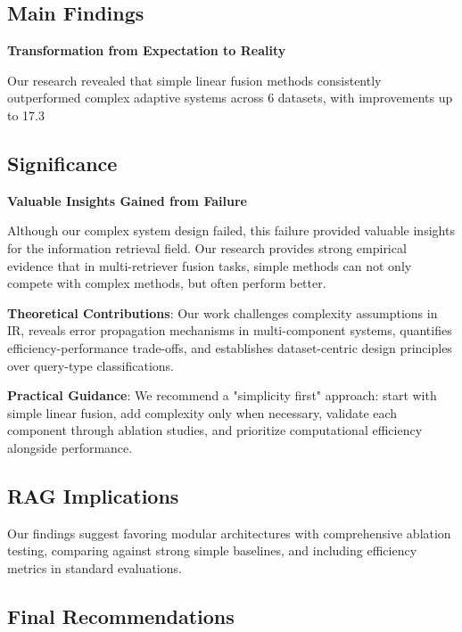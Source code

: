 \documentclass[letterpaper]{article} %
\begin{document}
\subsection{Main Findings}

\textbf{Transformation from Expectation to Reality}

Our research revealed that simple linear fusion methods consistently outperformed complex adaptive systems across 6 datasets, with improvements up to 17.3%

\subsection{Significance}

\textbf{Valuable Insights Gained from Failure}

Although our complex system design failed, this failure provided valuable insights for the information retrieval field. Our research provides strong empirical evidence that in multi-retriever fusion tasks, simple methods can not only compete with complex methods, but often perform better.

\textbf{Theoretical Contributions}: Our work challenges complexity assumptions in IR, reveals error propagation mechanisms in multi-component systems, quantifies efficiency-performance trade-offs, and establishes dataset-centric design principles over query-type classifications.

\textbf{Practical Guidance}: We recommend a "simplicity first" approach: start with simple linear fusion, add complexity only when necessary, validate each component through ablation studies, and prioritize computational efficiency alongside performance.

\subsection{RAG Implications}

Our findings suggest favoring modular architectures with comprehensive ablation testing, comparing against strong simple baselines, and including efficiency metrics in standard evaluations.

\subsection{Final Recommendations}
\end{document}
